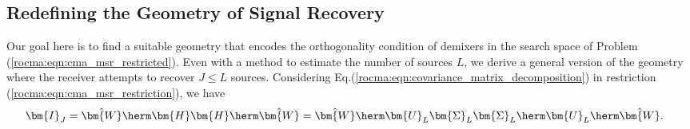 \subsection{Redefining the Geometry of Signal Recovery}
Our goal here is to find a suitable geometry that encodes the orthogonality condition of demixers in the search space of Problem (\ref{rocma:eqn:cma_msr_restricted}). 
Even with a method to estimate the number of sources $L$, we derive a general version of the geometry where the receiver attempts to recover $J\leq L$ sources. 
Considering Eq.(\ref{rocma:eqn:covariance_matrix_decomposition}) in restriction (\ref{rocma:eqn:cma_msr_restriction}), we have
\begin{align}
	\bm{I}_{J}&=\hat{\bm{W}}\herm\bm{H}\bm{H}\herm\hat{\bm{W}}= \hat{\bm{W}}\herm\bm{U}_L\bm{\Sigma}_L\bm{\Sigma}_L\herm\bm{U}_L\herm\hat{\bm{W}}.\label{rocma:eqn:restriction_svd}
\end{align}

